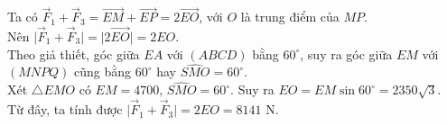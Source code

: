 \begin{ex}
{\begin{center}
		\end{center}
			Ta có  $\overrightarrow{F}_1+\overrightarrow{F}_3=\overrightarrow{EM}+\overrightarrow{EP}=2\overrightarrow{EO}$, với $O$ là trung điểm của $MP$.\\
		Nên 
		 $\big|\overrightarrow{F}_1+\overrightarrow{F}_3\big|=\big|2\overrightarrow{EO}\big|=2EO$.\\
			Theo giả thiết, góc giữa $EA$ với $(ABCD)$ bằng $60^\circ$, suy ra góc giữa $EM$ với $(MNPQ)$ cũng bằng $60^\circ$ hay $\widehat{SMO}=60^\circ$.\\
			Xét $\triangle EMO$ có $EM=4700$, $\widehat{SMO}=60^\circ$. Suy ra $EO = EM \sin 60^\circ = 2350\sqrt{3}$.\\
			Từ đây, ta tính được $\big|\overrightarrow{F}_1+\overrightarrow{F}_3\big|=2EO=8141$ N.
		}
\end{ex}


